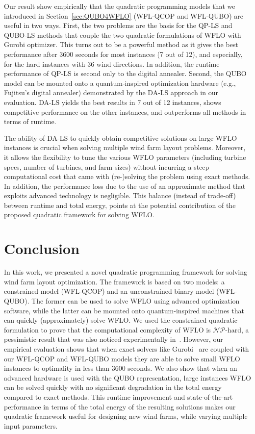 \documentclass[preprint,12pt]{elsarticle}
\begin{document}
Our result show empirically that the quadratic programming models that we
introduced in Section~\ref{sec:QUBO4WFLO} (WFL-QCOP and WFL-QUBO) are useful in two ways.
First, the two problems are the basis for the QP-LS and QUBO-LS methods that couple the two
quadratic formulations of WFLO with Gurobi optimizer. This turns out
to be a powerful method as it gives the best performance after 3600 seconds for most instances (7 out of 12),
and especially,
for the hard instances with 36 wind directions. In addition, the runtime performance of QP-LS is second
only to the digital annealer.  Second, the QUBO model can be mounted onto a quantum-inspired optimization hardware (e.g., Fujitsu's digital annealer) demonstrated by the DA-LS approach in our evaluation. DA-LS yields the best results in 7 out of 12 
instances, shows competitive performance on the other instances, and outperforms all methods in terms of runtime.
 
The ability of DA-LS to quickly obtain competitive solutions on large WFLO instances 
is crucial when solving
multiple wind farm layout problems. Moreover, it allows the flexibility to tune the various WFLO parameters (including turbine specs, number of turbines, and farm sizes) without incurring a steep computational cost that came
with (re-)solving the problem using exact methods. In addition, the performance loss due to the use of an approximate method 
that exploits advanced technology is negligible. This balance (instead of trade-off) between
runtime and total energy, points at the potential contribution of the proposed quadratic framework for solving WFLO. 


  
\section{Conclusion}
\label{sec:conclusion}

In this work, we presented a novel quadratic programming framework
for solving 
wind farm layout optimization. 
The framework is based on two models: a constrained model (WFL-QCOP) and an unconstrained binary
model (WFL-QUBO). The former can be used to solve WFLO using advanced optimization software,
while the latter can be mounted onto quantum-inspired machines that can quickly (approximately) solve WFLO. We used the constrained quadratic formulation to prove 
that the computational complexity of WFLO is $\mathcal{NP}$-hard, a pessimistic result that 
was also noticed experimentally in~\cite{Zhang2014}. However,
our empirical evaluation shows that when exact solvers like Gurobi~\cite{gurobi} are
coupled with our WFL-QCOP and WFL-QUBO models they are able to solve small WFLO instances to optimality in less than 3600 seconds.
We also show that when an advanced hardware is used with the QUBO representation, large instances WFLO can be solved quickly with no significant degradation in the total energy compared to exact methods.
This runtime improvement and state-of-the-art performance in terms of the total energy of the resulting solutions makes our quadratic framework useful for designing new wind farms, while varying multiple input parameters. 
\end{document}
